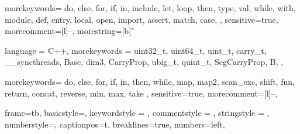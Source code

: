 
{
  morekeywords={
    do,
    else,
    for,
    if,
    in,
    include,
    let,
    loop,
    then,
    type,
    val,
    while,
    with,
    module,
    def,
    entry,
    local,
    open,
    import,
    assert,
    match,
    case,
  },
  sensitive=true, %
  morecomment=[l]{--}, %
  morestring=[b]" %
}

{
  language = C++,
  morekeywords = {
    uint32_t,
    uint64_t,
    uint_t,
    carry_t,
    __syncthreads,
    Base,
    dim3,
    CarryProp,
    ubig_t,
    quint_t,
    SegCarryProp,
    B,
  },
}

{
  morekeywords={
    do,
    else,
    for,
    if,
    in,
    then,
    while,
    map,
    map2,
    scan_exc,
    shift,
    fun,
    return,
    concat,
    reverse,
    min,
    max,
    take
  },
  sensitive=true,
  morecomment=[l]{--},
}

{
  frame=tb,
  basicstyle=\footnotesize\ttfamily,
  keywordstyle = \color{RoyalBlue},
  commentstyle = \color{ForestGreen},
  stringstyle = \color{purple},
  numberstyle=\scriptsize\color{darkgray},
  captionpos=t,
  breaklines=true,
  numbers=left,
}

\lstset{style=myStyle}

